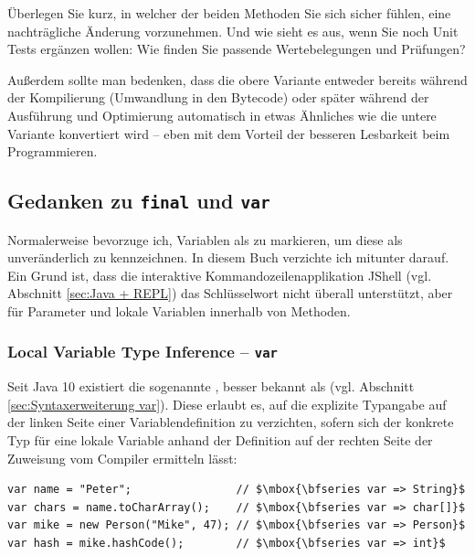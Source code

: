 Überlegen Sie  kurz, in welcher der beiden Methoden Sie
sich sicher fühlen, eine nachträgliche Änderung vorzunehmen.
Und wie sieht es aus, wenn Sie noch Unit Tests
ergänzen wollen: Wie finden Sie passende Wertebelegungen und Prüfungen?


Außerdem sollte man bedenken, dass die
obere Variante entweder bereits während der
Kompilierung (Umwandlung in den Bytecode) oder
später während der Ausführung und Optimierung
automatisch in etwas Ähnliches wie die untere Variante konvertiert wird --
eben mit dem Vorteil der besseren Lesbarkeit beim Programmieren.






\subsection{Gedanken zu \texttt{final} und \texttt{var}}


Normalerweise bevorzuge ich, Variablen als  zu markieren, um diese
als unveränderlich zu kennzeichnen. In diesem Buch verzichte ich mitunter darauf.
Ein Grund ist, dass die interaktive Kommandozeilenapplikation JShell (vgl. Abschnitt \ref{sec:Java + REPL})
das Schlüsselwort  nicht überall unterstützt, aber für Parameter und lokale Variablen
innerhalb von Methoden.


\subsubsection{Local Variable Type Inference -- \texttt{var}}
Seit Java 10 existiert die sogenannte ,
besser bekannt als  (vgl. Abschnitt \ref{sec:Syntaxerweiterung var}).
Diese erlaubt es, auf die explizite Typangabe
auf der linken Seite einer Variablendefinition zu verzichten, sofern  sich der
konkrete Typ für eine lokale Variable anhand der Definition auf der
rechten Seite der Zuweisung vom Compiler ermitteln lässt:


\lstset{mathescape=true}
\vspace{-0.85mm}
\begin{lstlisting}
var name = "Peter";                // $\mbox{\bfseries var => String}$
var chars = name.toCharArray();    // $\mbox{\bfseries var => char[]}$
var mike = new Person("Mike", 47); // $\mbox{\bfseries var => Person}$
var hash = mike.hashCode();        // $\mbox{\bfseries var => int}$
\end{lstlisting}
\vspace{-0.85mm}
\lstset{mathescape=false}


